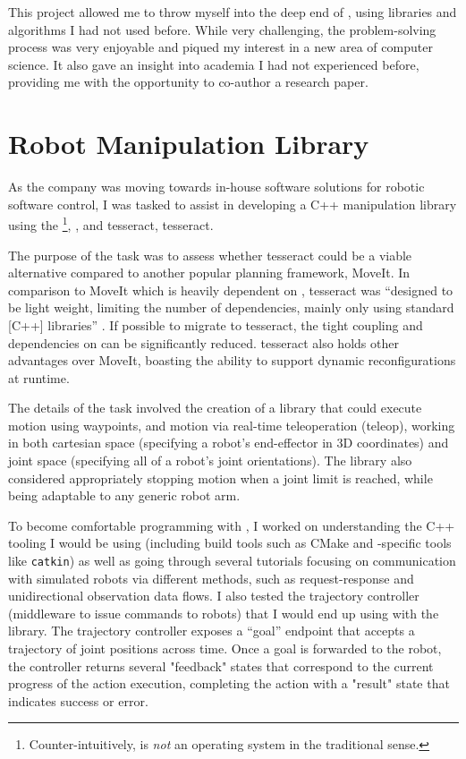 This project allowed me to throw myself into the deep end of , using libraries and
algorithms I had not used before. While very challenging, the problem-solving process was very
enjoyable and piqued my interest in a new area of computer science. It also gave an insight into
academia I had not experienced before, providing me with the opportunity to co-author a research
paper.

\section{Robot Manipulation Library}

As the company was moving towards in-house software solutions for robotic software control, I was
tasked to assist in developing a C++ manipulation library using the
\footnote{Counter-intuitively,  is \emph{not} an operating system in the
    traditional sense.}, , and \gls*{tesseract}, \glsdesc*{tesseract}.

The purpose of the task was to assess whether \gls*{tesseract} could be a viable alternative
compared to another popular planning framework, MoveIt. In comparison to MoveIt which is heavily
dependent on , \gls*{tesseract} was \enquote{designed to be light weight, limiting the
    number of dependencies, mainly only using standard [C++] libraries} \autocite{tesseractgithub}. If
possible to migrate to \gls*{tesseract}, the tight coupling and dependencies on  can be
significantly reduced. \gls*{tesseract} also holds other advantages over MoveIt, boasting the
ability to support dynamic reconfigurations at runtime.

The details of the task involved the creation of a library that could execute motion using
waypoints, and motion via real-time teleoperation (teleop), working in both cartesian space
(specifying a robot's end-effector in 3D coordinates) and joint space (specifying all of a robot's
joint orientations). The library also considered appropriately stopping motion when a joint limit is
reached, while being adaptable to any generic robot arm.

To become comfortable programming with , I worked on understanding the C++ tooling I would
be using (including build tools such as CMake and -specific tools like \texttt{catkin}) as
well as going through several tutorials focusing on communication with simulated robots via
different methods, such as request-response and unidirectional observation data flows. I also tested
the trajectory controller (middleware to issue commands to robots) that I would end up using with
the library. The trajectory controller exposes a \enquote{goal} endpoint that accepts a trajectory
of joint positions across time. Once a goal is forwarded to the robot, the controller returns
several "feedback" states that correspond to the current progress of the action execution,
completing the action with a "result" state that indicates success or error.

